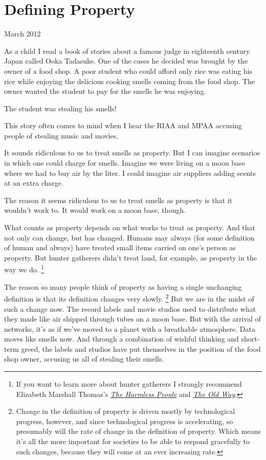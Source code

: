 \chapter{Defining Property}

March 2012

As a child I read a book of stories about a famous judge in eighteenth
century Japan called Ooka Tadasuke. One of the cases he decided was
brought by the owner of a food shop. A poor student who could afford
only rice was eating his rice while enjoying the delicious cooking
smells coming from the food shop. The owner wanted the student to pay
for the smells he was enjoying.

The student was stealing his smells!

This story often comes to mind when I hear the RIAA and MPAA accusing
people of stealing music and movies.

It sounds ridiculous to us to treat smells as property. But I can
imagine scenarios in which one could charge for smells. Imagine we were
living on a moon base where we had to buy air by the liter. I could
imagine air suppliers adding scents at an extra charge.

The reason it seems ridiculous to us to treat smells as property is that
it wouldn't work to. It would work on a moon base, though.

What counts as property depends on what works to treat as property. And
that not only can change, but has changed. Humans may always (for some
definition of human and always) have treated small items carried on
one's person as property. But hunter gatherers didn't treat land, for
example, as property in the way we do. \footnote{If you want to learn more about hunter gatherers I strongly
recommend Elizabeth Marshall Thomas's
\href{http://www.amazon.com/Harmless-People-Elizabeth-Marshall-Thomas/dp/0394427793}{\emph{The
Harmless People}} and
\href{http://www.amazon.com/Old-Way-Story-First-People/dp/0374225524}{\emph{The
Old Way}}.}

The reason so many people think of property as having a single
unchanging definition is that its definition changes very slowly.
\footnote{Change in the definition of property is driven mostly by
technological progress, however, and since technological progress is
accelerating, so presumably will the rate of change in the definition of
property. Which means it's all the more important for societies to be
able to respond gracefully to such changes, because they will come at an
ever increasing rate.} But we are in the midst of such a change now.
The record labels and movie studios used to distribute what they made
like air shipped through tubes on a moon base. But with the arrival of
networks, it's as if we've moved to a planet with a breathable
atmosphere. Data moves like smells now. And through a combination of
wishful thinking and short-term greed, the labels and studios have put
themselves in the position of the food shop owner, accusing us all of
stealing their smells.


